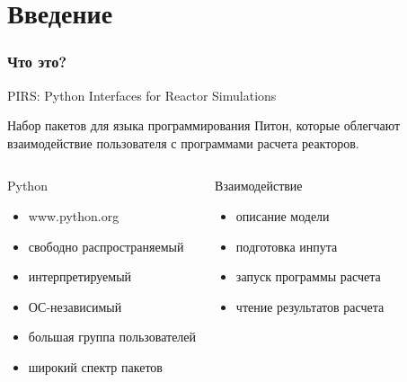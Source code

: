 \documentclass[t]{beamer}
\begin{document}
\section{Введение}
\begin{frame}\frametitle{Что это?}

    \begin{block}{PIRS: Python Interfaces for Reactor Simulations}

    Набор пакетов для языка программирования Питон, которые облегчают 
    взаимодействие пользователя с программами расчета реакторов.
    \end{block}

    \begin{columns}
    \begin{block}{Python}
    \begin{itemize}

        \item www.python.org

        \item свободно распространяемый

        \item интерпретируемый

        \item ОС-независимый

        \item большая группа пользователей

        \item широкий спектр пакетов

    \end{itemize}
    \end{block}

    \begin{block}{Взаимодействие}
    \begin{itemize}
        
        \item описание модели

        \item подготовка инпута

        \item запуск программы расчета

        \item  чтение результатов расчета

    \end{itemize}
    \end{block}
    \end{columns}
\end{frame}
\end{document}
